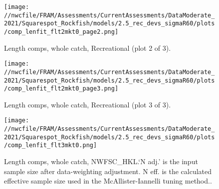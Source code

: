 \documentclass[11pt,
  english,
  a4paper,
]{article}
\begin{document}
\tagmcend\tagstructend


\begin{figure}
\centering
\texttt{[image: //nwcfile/FRAM/Assessments/CurrentAssessments/DataModerate\_2021/Squarespot\_Rockfish/models/2.5\_rec\_devs\_sigmaR60/plots/comp\_lenfit\_flt2mkt0\_page2.png]}
\caption{Length comps, whole catch, Recreational (plot 2 of 3).\label{fig:comp_lenfit_flt2mkt0_page2}}
\end{figure}

\tagmcend\tagstructend


\begin{figure}
\centering
\texttt{[image: //nwcfile/FRAM/Assessments/CurrentAssessments/DataModerate\_2021/Squarespot\_Rockfish/models/2.5\_rec\_devs\_sigmaR60/plots/comp\_lenfit\_flt2mkt0\_page3.png]}
\caption{Length comps, whole catch, Recreational (plot 3 of 3).\label{fig:comp_lenfit_flt2mkt0_page3}}
\end{figure}

\tagmcend\tagstructend


\begin{figure}
\centering
\texttt{[image: //nwcfile/FRAM/Assessments/CurrentAssessments/DataModerate\_2021/Squarespot\_Rockfish/models/2.5\_rec\_devs\_sigmaR60/plots/comp\_lenfit\_flt3mkt0.png]}
\caption{Length comps, whole catch, NWFSC\_HKL.`N adj.' is the input sample size after data-weighting adjustment. N eff. is the calculated effective sample size used in the McAllister-Iannelli tuning method..\label{fig:comp_lenfit_flt3mkt0}}
\end{figure}

\tagmcend\tagstructend

\end{document}
